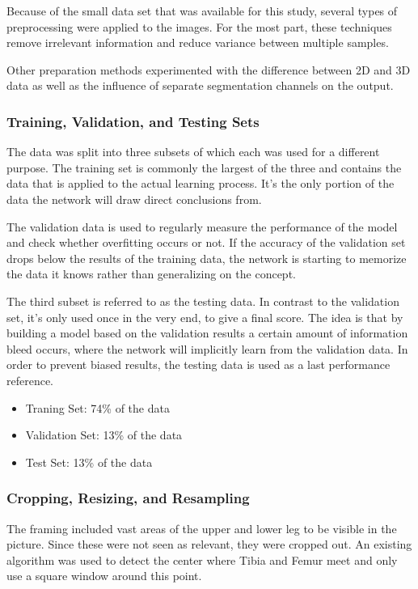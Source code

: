 Because of the small data set that was available for this study, several types of preprocessing were applied to the images. For the most part, these techniques remove irrelevant information and reduce variance between multiple samples.

Other preparation methods experimented with the difference between 2D and 3D data as well as the influence of separate segmentation channels on the output.

\subsubsection{Training, Validation, and Testing Sets}

The data was split into three subsets of which each was used for a different purpose. The training set is commonly the largest of the three and contains the data that is applied to the actual learning process. It's the only portion of the data the network will draw direct conclusions from. 

The validation data is used to regularly measure the performance of the model and check whether overfitting occurs or not. If the accuracy of the validation set drops below the results of the training data, the network is starting to memorize the data it knows rather than generalizing on the concept.

The third subset is referred to as the testing data. In contrast to the validation set, it's only used once in the very end, to give a final score. The idea is that by building a model based on the validation results a certain amount of information bleed occurs, where the network will implicitly learn from the validation data. In order to prevent biased results, the testing data is used as a last performance reference.

\begin{itemize}
\item Traning Set: 74\% of the data
\item Validation Set: 13\% of the data
\item Test Set: 13\% of the data
\end{itemize}

\subsubsection{Cropping, Resizing, and Resampling}

The framing included vast areas of the upper and lower leg to be visible in the picture. Since these were not seen as relevant, they were cropped out. An existing algorithm was used to detect the center where Tibia and Femur meet and only use a square window around this point.

